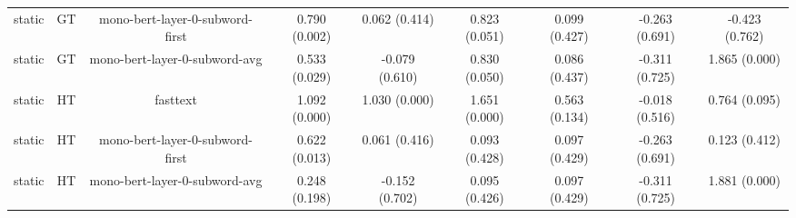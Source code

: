 \begin{sidewaystable}[htb]
\begin{tabular}{@{}ccccccccc@{}}
        static & GT & mono-bert-layer-0-subword-first & 0.790 (0.002) & 0.062 (0.414) & 0.823 (0.051) & 0.099 (0.427) & -0.263 (0.691) & -0.423 (0.762) \\
        static & GT & mono-bert-layer-0-subword-avg & 0.533 (0.029) & -0.079 (0.610) & 0.830 (0.050) & 0.086 (0.437) & -0.311 (0.725) & 1.865 (0.000) \\
        static & HT & fasttext & 1.092 (0.000) & 1.030 (0.000) & 1.651 (0.000) & 0.563 (0.134) & -0.018 (0.516) & 0.764 (0.095) \\
        static & HT & mono-bert-layer-0-subword-first & 0.622 (0.013) & 0.061 (0.416) & 0.093 (0.428) & 0.097 (0.429) & -0.263 (0.691) & 0.123 (0.412) \\
        static & HT & mono-bert-layer-0-subword-avg & 0.248 (0.198) & -0.152 (0.702) & 0.095 (0.426) & 0.097 (0.429) & -0.311 (0.725) & 1.881 (0.000) \\
        \bottomrule
    \end{tabular}
\end{sidewaystable}